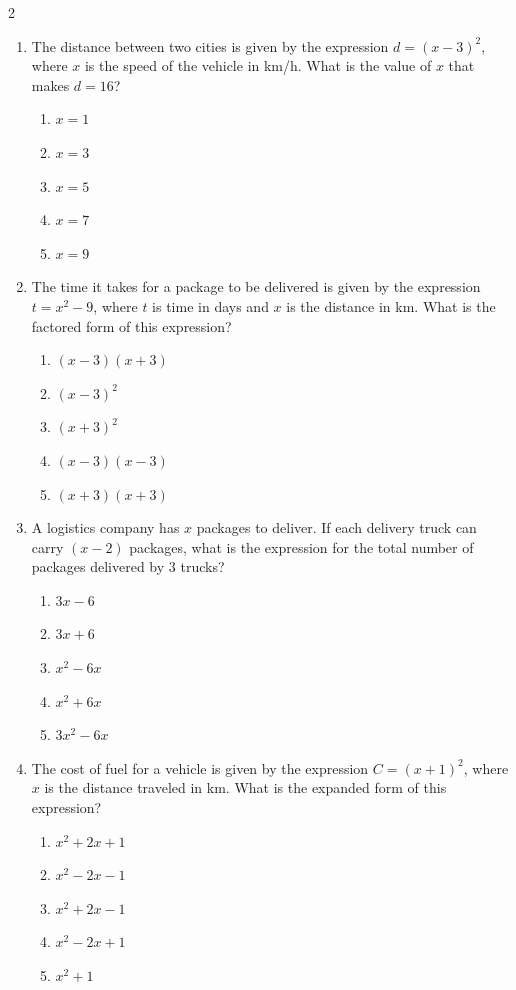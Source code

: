 \documentclass[10pt]{article}
\begin{document}
\begin{multicols}{2}
\begin{enumerate}[label=\textbf{Q\arabic*.}, leftmargin=*, itemsep=6pt, parsep=0pt]
  \item \small The distance between two cities is given by the expression $d = (x - 3)^2$, where $x$ is the speed of the vehicle in km/h. What is the value of $x$ that makes $d = 16$?
  \begin{enumerate}[label=(\Alph*), leftmargin=0.6cm, nosep, itemsep=2pt]
    \item $x = 1$
    \item $x = 3$
    \item $x = 5$
    \item $x = 7$
    \item $x = 9$
  \end{enumerate}

  \item \small The time it takes for a package to be delivered is given by the expression $t = x^2 - 9$, where $t$ is time in days and $x$ is the distance in km. What is the factored form of this expression?
  \begin{enumerate}[label=(\Alph*), leftmargin=0.6cm, nosep, itemsep=2pt]
    \item $(x - 3)(x + 3)$
    \item $(x - 3)^2$
    \item $(x + 3)^2$
    \item $(x - 3)(x - 3)$
    \item $(x + 3)(x + 3)$
  \end{enumerate}

  \item \small A logistics company has $x$ packages to deliver. If each delivery truck can carry $(x - 2)$ packages, what is the expression for the total number of packages delivered by $3$ trucks?
  \begin{enumerate}[label=(\Alph*), leftmargin=0.6cm, nosep, itemsep=2pt]
    \item $3x - 6$
    \item $3x + 6$
    \item $x^2 - 6x$
    \item $x^2 + 6x$
    \item $3x^2 - 6x$
  \end{enumerate}

  \item \small The cost of fuel for a vehicle is given by the expression $C = (x + 1)^2$, where $x$ is the distance traveled in km. What is the expanded form of this expression?
  \begin{enumerate}[label=(\Alph*), leftmargin=0.6cm, nosep, itemsep=2pt]
    \item $x^2 + 2x + 1$
    \item $x^2 - 2x - 1$
    \item $x^2 + 2x - 1$
    \item $x^2 - 2x + 1$
    \item $x^2 + 1$
  \end{enumerate}


\end{enumerate}
\end{multicols}
\end{document}
